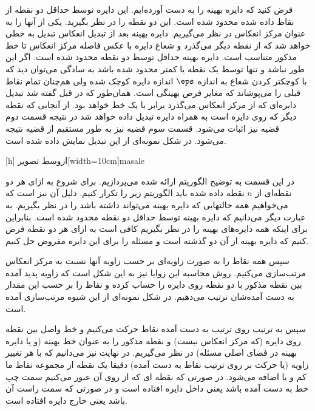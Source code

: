 فرض کنید که دایره بهینه را به دست آورده‌ایم. این دایره توسط حداقل دو نقطه از نقاط داده شده محدود شده است. این دو نقطه را در نظر بگیرید. یکی از آنها را به عنوان مرکز انعکاس در نظر می‌گیریم. دایره بهینه بعد از تبدیل انعکاس تبدیل به خطی خواهد شد که از نقطه دیگر می‌گذرد و شعاع دایره با عکس فاصله مرکز انعکاس تا خط مذکور متناسب است.
دایره بهینه حداقل توسط دو نقطه محدود شده است. اگر این طور نباشد و تنها توسط یک نقطه یا کمتر محدود شده باشد به سادگی می‌توان دید که با کوچکتر کردن شعاع به اندازه $\eps$ اندازه دایره کوچک شده ولی هم‌چنان تمام نقاط قبلی را می‌پوشاند که مغایر فرض بهینگی است.
همان‌طور که در قبل گفته شد تبدیل دایره‌ای که از مرکز انعکاس می‌گذرد برابر با یک خط خواهد بود. از آنجایی که نقطه دیگر که روی دایره است به همراه دایره تبدیل داده خواهد شد در نتیجه قسمت دوم قضیه نیز اثبات می‌شود.
قسمت سوم قضیه نیز به طور مستقیم از قضیه  نتیجه می‌شود. در شکل  نمونه‌ای از این تبدیل نمایش داده شده است.

[h]
‌ازوسط
‌تصویر[width=10cm]{masale}

در این قسمت به توضیح الگوریتم ارائه شده می‌پردازیم. برای شروع به ازای هر دو نقطه‌ای از $n$ نقطه داده شده باید الگوریتم زیر را تکرار کنیم. دلیل آن نیز است که می‌خواهیم همه حالتهایی که دایره بهینه می‌تواند داشته باشد را در نظر بگیریم. به عبارت دیگر می‌دانیم که دایره بهینه توسط حداقل دو نقطه محدود شده است. بنابراین برای اینکه همه دایره‌های بهینه را در نظر بگیریم کافی است به ازای هر دو نقطه فرض کنیم که دایره بهینه از آن دو گذشته است و مسئله را برای این دایره مفروض حل کنیم.

سپس همه نقاط را به صورت زاویه‌ای بر حسب زاویه آنها نسبت به مرکز انعکاس مرتب‌سازی می‌کنیم. روش محاسبه این زوایا نیز به این شکل است که زاویه پدید آمده بین نقطه مذکور با دو نقطه روی دایره را حساب کرده و نقاط را بر حسب این مقدار به دست آمده‌شان ترتیب می‌دهیم. در شکل  نمونه‌ای از این شیوه مرتب‌سازی آمده است.

سپس به ترتیب روی ترتیب به دست آمده نقاط حرکت می‌کنیم و خط واصل بین نقطه روی دایره (که مرکز انعکاس نیست) و نقطه مذکور را به عنوان خط بهینه (و یا دایره بهینه در فضای اصلی مسئله) در نظر می‌گیریم. در نهایت نیز می‌دانیم که با هر تغییر زاویه (یا حرکت بر روی ترتیب نقاط به دست آمده) دقیقا یک نقطه از مجموعه نقاط ما کم و یا اضافه می‌شود. در صورتی که نقطه ای که از روی آن عبور می‌کنیم سمت چپ خط به دست آمده باشد یعنی داخل دایره افتاده است و در صورتی که سمت راست آن باشد یعنی خارج دایره افتاده است.\\


